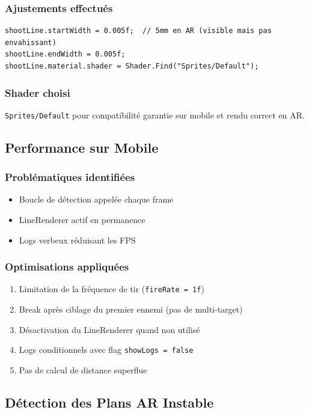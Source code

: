 \documentclass[12pt,a4paper]{article}
\begin{document}
\subsubsection{Ajustements effectués}
\begin{lstlisting}
shootLine.startWidth = 0.005f;  // 5mm en AR (visible mais pas envahissant)
shootLine.endWidth = 0.005f;
shootLine.material.shader = Shader.Find("Sprites/Default");
\end{lstlisting}

\subsubsection{Shader choisi}
\texttt{Sprites/Default} pour compatibilité garantie sur mobile et rendu correct en AR.

\subsection{Performance sur Mobile}

\subsubsection{Problématiques identifiées}
\begin{itemize}
    \item Boucle de détection appelée chaque frame
    \item LineRenderer actif en permanence
    \item Logs verbeux réduisant les FPS
\end{itemize}

\subsubsection{Optimisations appliquées}
\begin{enumerate}
    \item Limitation de la fréquence de tir (\texttt{fireRate = 1f})
    \item Break après ciblage du premier ennemi (pas de multi-target)
    \item Désactivation du LineRenderer quand non utilisé
    \item Logs conditionnels avec flag \texttt{showLogs = false}
    \item Pas de calcul de distance superflue
\end{enumerate}

\subsection{Détection des Plans AR Instable}
\end{document}
